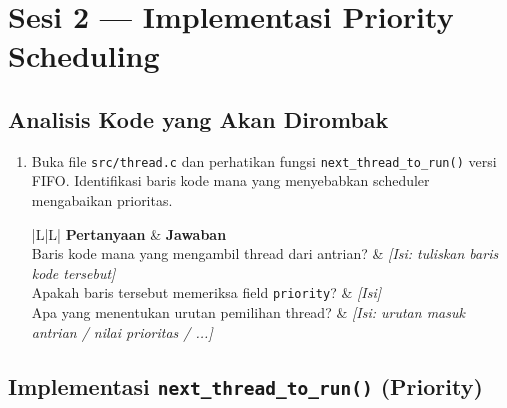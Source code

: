 \section{Sesi 2 — Implementasi Priority Scheduling}

\subsection{Analisis Kode yang Akan Dirombak}

\begin{enumerate}

	\item Buka file \texttt{src/thread.c} dan perhatikan fungsi \texttt{next\_thread\_to\_run()} versi FIFO. Identifikasi baris kode mana yang menyebabkan scheduler mengabaikan prioritas.

	      \begin{table}[htbp]
		      \centering
		      \caption{Identifikasi kelemahan kode Round-Robin}
		      \begin{tabulary}{\textwidth}{|L|L|}
			      \hline
			      \textbf{Pertanyaan} & \textbf{Jawaban} \\ \hline
			      Baris kode mana yang mengambil thread dari antrian?
			      & \textit{[Isi: tuliskan baris kode tersebut]} \\ \hline
			      Apakah baris tersebut memeriksa field \texttt{priority}?
			      & \textit{[Isi]} \\ \hline
			      Apa yang menentukan urutan pemilihan thread?
			      & \textit{[Isi: urutan masuk antrian / nilai prioritas / ...]} \\ \hline
		      \end{tabulary}
	      \end{table}

\end{enumerate}

\subsection{Implementasi \texttt{next\_thread\_to\_run()} (Priority)}

